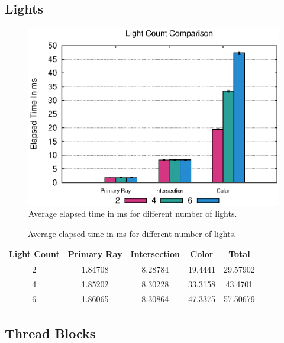 \documentclass{article}
\begin{document}
\subsection{Lights}

\begin{figure}[h!tbp]
    \centering
    \includegraphics[width=1.0\columnwidth]{Figures/lightcount.eps}
    \caption{Average elapsed time in ms for different number of lights. \label{fig:lightCount}}
\end{figure}

\begin{table}[h!btp]
\centering
\begin{tabular}{c|c|c|c|c}
    Light Count & Primary Ray & Intersection & Color & Total \\ [2pt]
\hline
    2 & 1.84708 & 8.28784 & 19.4441 & 29.57902 \\
\hline
    4 & 1.85202 & 8.30228 & 33.3158 & 43.4701 \\
\hline
    6 & 1.86065 & 8.30864 & 47.3375 & 57.50679 \\
\hline
\end{tabular}
\caption{Average elapsed time in ms for different number of lights. \label{tab:ResultsNumberOfLights}}
\end{table}


\subsection{Thread Blocks}
\end{document}

